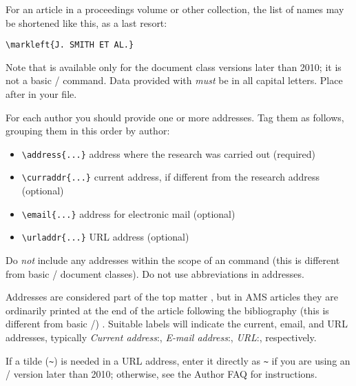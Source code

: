 \ifproceedings
\noindent
For an article in a proceedings volume or other collection, the list of
names may be shortened like this, as a last resort:
\begin{trivlist}
\item\relax
\verb+\markleft{J. SMITH ET AL.}+
\end{trivlist}

\noindent
Note that  is available only for the document class
 versions later than 2010; it is not a basic \latex/
command.  Data provided with  \emph{must} be in all
capital letters.  Place  after  in your
file.
\fi %

\fi\fi %

For each author you should provide one or more addresses.  Tag them
as follows, grouping them in this order by author:
\begin{itemize}
\item\verb+\address{...}+ address where the research was carried out (required) 
\item\verb+\curraddr{...}+ current address, if different from the research
 address\\ (optional)
\item\verb+\email{...}+ address for electronic mail (optional)
\item\verb+\urladdr{...}+ URL address (optional)
\end{itemize}
Do \emph{not} include any addresses within the scope of an 
command (this is different from basic \latex/ document classes).
Do not use abbreviations in addresses.

Addresses are considered part of the top matter%
\ifmonograph
\else\ifmemoirs
\else,
 but in AMS articles
 they are ordinarily printed at the end of the article following the
 bibliography (this is different from basic \latex/)%
\fi\fi.
Suitable labels will indicate the current, email, and URL addresses,
typically \textit{Current address}:, \textit{E-mail address}:, \textit{URL}:,
respectively.

If a tilde (\texttt{\textasciitilde}) is needed in a URL address, enter it
directly as \texttt{\textasciitilde} if you are using an \amslatex/
version later than 2010; otherwise, see the Author FAQ \cite{FAQ}
for instructions.

